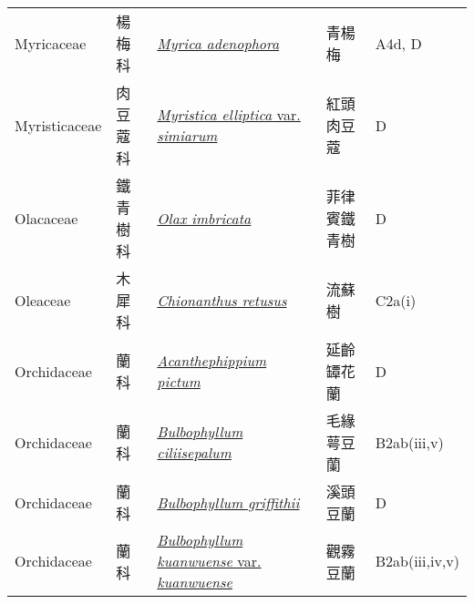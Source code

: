 {\begin{longtable}{L{2.5cm}L{2cm}L{5cm}L{2.5cm}L{3cm}}
    Myricaceae & 楊梅科 & \href{http://www.theplantlist.org/tpl1.1/search?q=Myrica+adenophora}{\textit{Myrica adenophora} } & 青楊梅 & A4d, D    \\
    Myristicaceae & 肉豆蔻科 & \href{http://www.theplantlist.org/tpl1.1/search?q=Myristica+elliptica+var.+simiarum}{\textit{Myristica elliptica} var. \textit{simiarum} } & 紅頭肉豆蔻 & D    \\
    Olacaceae & 鐵青樹科 & \href{http://www.theplantlist.org/tpl1.1/search?q=Olax+imbricata}{\textit{Olax imbricata} } & 菲律賓鐵青樹 & D    \\
    Oleaceae & 木犀科 & \href{http://www.theplantlist.org/tpl1.1/search?q=Chionanthus+retusus}{\textit{Chionanthus retusus} } & 流蘇樹 & C2a(i)    \\
    Orchidaceae & 蘭科 & \href{http://www.theplantlist.org/tpl1.1/search?q=Acanthephippium+pictum}{\textit{Acanthephippium pictum} } & 延齡罈花蘭 & D    \\
    Orchidaceae & 蘭科 & \href{http://www.theplantlist.org/tpl1.1/search?q=Bulbophyllum+ciliisepalum}{\textit{Bulbophyllum ciliisepalum} } & 毛緣萼豆蘭 & B2ab(iii,v)    \\
    Orchidaceae & 蘭科 & \href{http://www.theplantlist.org/tpl1.1/search?q=Bulbophyllum+griffithii}{\textit{Bulbophyllum griffithii} } & 溪頭豆蘭 & D    \\
    Orchidaceae & 蘭科 & \href{http://www.theplantlist.org/tpl1.1/search?q=Bulbophyllum+kuanwuense+var.+kuanwuense}{\textit{Bulbophyllum kuanwuense} var. \textit{kuanwuense} } & 觀霧豆蘭 & B2ab(iii,iv,v)    \\

\end{longtable}}
